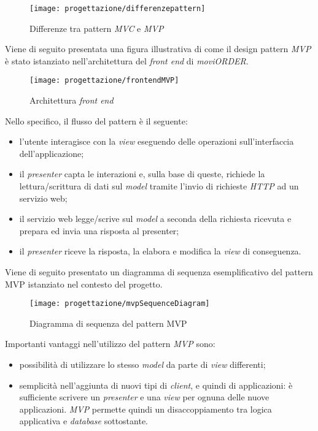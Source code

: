\begin{figure}[!h] 
    \centering 
    \texttt{[image: progettazione/differenzepattern]} 
    \caption{Differenze tra pattern \textit{MVC} e \textit{MVP}}
\end{figure}

Viene di seguito presentata una figura illustrativa di come il design pattern \textit{MVP} è stato istanziato nell'architettura del \textit{front end} di \textit{moviORDER}.

\begin{figure}[!h] 
    \centering 
    \texttt{[image: progettazione/frontendMVP]} 
    \caption{Architettura \textit{front end}}
\end{figure}

Nello specifico, il flusso del pattern è il seguente:
\begin{itemize}
	\item l'utente interagisce con la \textit{view} eseguendo delle operazioni sull'interfaccia dell'applicazione;
	\item il \textit{presenter} capta le interazioni e, sulla base di queste, richiede la lettura/scrittura di dati sul \textit{model} tramite l'invio di richieste \textit{HTTP} ad un servizio web;
	\item il servizio web legge/scrive sul \textit{model} a seconda della richiesta ricevuta e prepara ed invia una risposta al presenter;
	\item il \textit{presenter} riceve la risposta, la elabora e modifica la \textit{view} di conseguenza.
\end{itemize}
Viene di seguito presentato un diagramma di sequenza esemplificativo del pattern MVP istanziato nel contesto del progetto.

\begin{figure}[!h] 
    \centering 
    \texttt{[image: progettazione/mvpSequenceDiagram]} 
    \caption{Diagramma di sequenza del pattern MVP}
\end{figure}

Importanti vantaggi nell'utilizzo del pattern \textit{MVP} sono:
\begin{itemize}
	\item possibilità di utilizzare lo stesso \textit{model} da parte di \textit{view} differenti;
	\item semplicità nell'aggiunta di nuovi tipi di \textit{client}, e quindi di applicazioni: è sufficiente scrivere un \textit{presenter} e una \textit{view} per ognuna delle nuove applicazioni. \textit{MVP} permette quindi un disaccoppiamento tra logica applicativa e \textit{database} sottostante.
\end{itemize}

